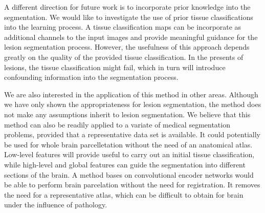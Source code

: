A different direction for future work is to incorporate prior knowledge into the
segmentation. We would like to investigate the use of prior tissue
classifications into the learning process. A tissue classification maps can be
incorporate as additional channels to the input images and provide meaningful
guidance for the lesion segmentation process. However, the usefulness of this
approach depends greatly on the quality of the provided tissue classification.
In the presents of lesions, the tissue classification might fail, which in turn
will introduce confounding information into the segmentation process.

We are also interested in the application of this method in other areas.
Although we have only shown the appropriateness for lesion segmentation, the
method does not make any assumptions inherit to lesion segmentation. We believe
that this method can also be readily applied to a variate of medical
segmentation problems, provided that a representative data set is available. It
could potentially be used for whole brain parcelletation without the need of an
anatomical atlas. Low-level features will provide useful to carry out an initial
tissue classification, while high-level and global features can guide the
segmentation into different sections of the brain. A method bases on
convolutional encoder networks would be able to perform brain parcelation
without the need for registration. It removes the need for a representative
atlas, which can be difficult to obtain for brain under the influence of
pathology.
